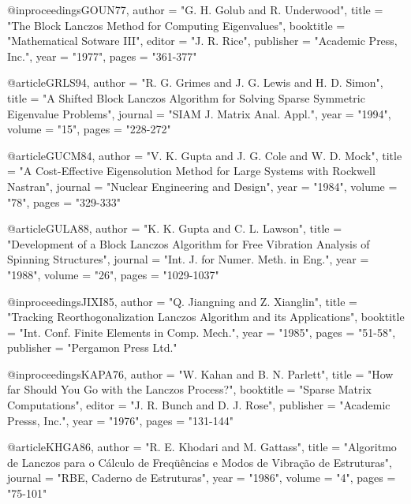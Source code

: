 @inproceedings{GOUN77,
   author       = "G. H. Golub and R. Underwood",
   title        = "{The Block Lanczos Method for
                   Computing Eigenvalues}",
   booktitle    = "Mathematical Sotware III",
   editor       = "J. R. Rice",
   publisher    = "Academic Press, Inc.",
   year         = "1977",
   pages        = "361-377"}

@article{GRLS94,
   author       = "R. G. Grimes and J. G. Lewis and H. D. Simon",
   title        = "{A Shifted Block Lanczos Algorithm for Solving Sparse
                   Symmetric Eigenvalue Problems}",
   journal      = "SIAM J. Matrix Anal. Appl.",
   year         = "1994",
   volume       = "15",
   pages        = "228-272"}

@article{GUCM84,  
   author       = "V. K. Gupta and  J. G. Cole and W. D. Mock",
   title        = "{A Cost-Effective Eigensolution Method for Large
                   Systems with Rockwell Nastran}",
   journal      = "Nuclear Engineering and Design",
   year         = "1984",
   volume       = "78",
   pages        = "329-333"}

@article{GULA88,
   author       = "K. K. Gupta and C. L. Lawson",
   title        = "{Development of a Block Lanczos Algorithm for Free
                   Vibration Analysis of Spinning Structures}",
   journal      = "Int. J. for Numer. Meth. in Eng.",
   year         = "1988",
   volume       = "26",
   pages        = "1029-1037"}

@inproceedings{JIXI85,
   author       = "Q. Jiangning and Z. Xianglin",
   title        = "{Tracking Reorthogonalization Lanczos Algorithm
                   and its Applications}",
   booktitle    = "Int. Conf. Finite Elements in Comp. Mech.",
   year         = "1985",
   pages        = "51-58",
   publisher    = "Pergamon Press Ltd."}
 
@inproceedings{KAPA76,   
   author       = "W. Kahan and B. N. Parlett",
   title        = "{How far Should You Go with the Lanczos Process?}",
   booktitle    = "Sparse Matrix Computations",
   editor       = "J. R. Bunch and D. J. Rose",
   publisher    = "Academic Presss, Inc.",
   year         = "1976",
   pages        = "131-144"}

@article{KHGA86, 
   author       = "R. E. Khodari and M. Gattass",
   title        = "{Algoritmo de Lanczos para o C\'alculo de
                   Freq\"{u}\^encias e Modos de Vibra\c{c}\~ao 
                   de Estruturas}",
   journal      = "RBE, Caderno de Estruturas",
   year         = "1986",
   volume       = "4",
   pages        = "75-101"}
 
